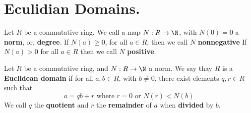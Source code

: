 \section{Eculidian Domains.}

\begin{definition}
    Let $R$ be a commutative ring. We call a map  $N:R \xrightarrow{} \N$, with
    $N(0)=0$ a \textbf{norm}, or, \textbf{degree}. If $N(a) \geq 0$, for all $a
    \in R$, then we call $N$ \textbf{nonnegative} If $N(a)>0$ for all $a \in R$
    then we call  $N$ \textbf{positive}.
\end{definition}

\begin{definition}
    Let $R$ be a commutative ring, and  $N:R \xrightarrow{} \N$ a norm. We say
    thay $R$ is a \textbf{Euclidean domain} if for all $a,b \in R$, with $b \neq
    0$, there exist elements  $q,r \in R$ such that
    \begin{equation*}
        a=qb+r \text{ where } r=0 \text{ or } N(r)<N(b)
    \end{equation*}
    We call $q$ the  \textbf{quotient} and $r$ the  \textbf{remainder} of $a$
    when  \textbf{divided} by $b$.
\end{definition}


